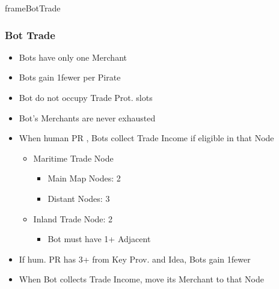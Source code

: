 \documentclass[10pt]{article}
\newlength{\fhBotTrade} \setlength\fhBotTrade{17\baselineskip}
\begin{document}
\begin{dynamiccontents*}{frameBotTrade}\begin{eubox}[botrulescolor]{\fhBotTrade}
	\botrules
	\subsubsection*{Bot Trade }
	\begin{itemize}
		\item Bots have only one Merchant
		\item Bots gain 1\botpower fewer per Pirate
		\item Bot \ships do not occupy Trade Prot. slots
		\item Bot's Merchants are never exhausted
	\end{itemize}
	\begin{itemize}
		\item When human PR , Bots collect Trade Income if eligible in that Node
		\begin{itemize}
			\item Maritime Trade Node
			\begin{itemize}
				\item Main Map Nodes: 2\botpower
				\item Distant Nodes: 3\botpower
			\end{itemize}
			\item Inland Trade Node: 2\botpower
			\begin{itemize}
				\item Bot must have 1+ Adjacent \town
			\end{itemize}
		\end{itemize}
		\item If hum. PR has 3+ \tradepower from Key Prov. and  Idea, Bots gain 1\botpower fewer
		\item When Bot collects Trade Income, move its Merchant to that Node
	\end{itemize}
\end{eubox}\end{dynamiccontents*}
\end{document}
